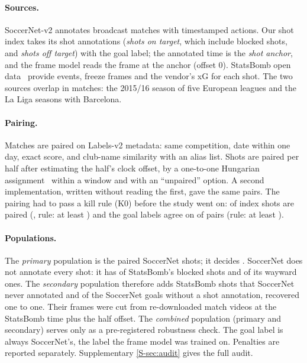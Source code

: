 \documentclass[10pt,twocolumn,letterpaper]{article}
\begin{document}
\paragraph{Sources.} SoccerNet-v2 annotates  broadcast matches with timestamped actions. Our shot
index takes its shot annotations (\emph{shots on target}, which include blocked shots, and \emph{shots off target})
with the goal label; the annotated time is the \emph{shot anchor}, and the frame model reads the frame at the anchor
(offset 0). StatsBomb open data~\cite{statsbomb_opendata} provide events, freeze frames and the vendor's xG for each
shot. The two sources overlap in  matches: the 2015/16 season of five European leagues and the La Liga
seasons with Barcelona.

\paragraph{Pairing.} Matches are paired on Labels-v2 metadata: same competition, date within one day, exact score, and
club-name similarity with an alias list. Shots are paired per half after estimating the half's clock offset, by a
one-to-one Hungarian assignment~\cite{kuhn1955hungarian} within a  window and with an ``unpaired''
option. A second implementation, written without reading the first, gave the same pairs. The pairing had to pass a kill
rule (K0) before the study went on:  of  index shots are paired (,
rule: at least ) and the goal labels agree on  of pairs (rule: at least
).

\paragraph{Populations.} The \emph{primary} population is the paired SoccerNet shots; it decides \Htwo. SoccerNet does not
annotate every shot: it has  of StatsBomb's blocked shots and  of its wayward ones. The
\emph{secondary} population therefore adds  StatsBomb shots that SoccerNet never annotated and
 of the  SoccerNet goals without a shot annotation, recovered one to one. Their frames
were cut from re-downloaded match videos at the StatsBomb time plus the half offset. The \emph{combined} population
(primary and secondary) serves only as a pre-registered robustness check. The goal label is always SoccerNet's, the
label the frame model was trained on. Penalties are reported separately. Supplementary \cref{S-sec:audit} gives the
full audit.
\end{document}
